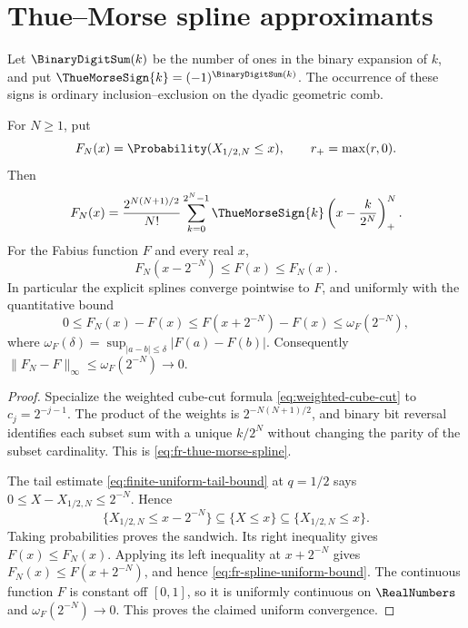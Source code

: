 \section{Thue--Morse spline approximants}
\label{sec:fr-thue-morse}

Let \(\BinaryDigitSum(k)\) be the number of ones in the binary expansion of \(k\), and put
\(\ThueMorseSign{k}=(-1)^{\BinaryDigitSum(k)}\).  The occurrence of these signs is ordinary
inclusion--exclusion on the dyadic geometric comb.

\begin{corollary}
\label{thm:fr-thue-morse-splines}
For \(N\ge1\), put
\[
 F_N(x)=\Probability(X_{1/2,N}\le x),
 \qquad r_+=\max(r,0).
\]
Then
\begin{equation}
 F_N(x)=\frac{2^{N(N+1)/2}}{N!}
 \sum_{k=0}^{2^N-1}\ThueMorseSign{k}
 \left(x-\frac{k}{2^N}\right)_+^N.
 \label{eq:fr-thue-morse-spline}
\end{equation}
For the Fabius function \(F\) and every real \(x\),
\begin{equation}
 F_N(x-2^{-N})\le F(x)\le F_N(x).
 \label{eq:fr-spline-sandwich}
\end{equation}
In particular the explicit splines converge pointwise to \(F\), and uniformly
with the quantitative bound
\begin{equation}
 0\le F_N(x)-F(x)
 \le F(x+2^{-N})-F(x)
 \le \omega_F(2^{-N}),
 \label{eq:fr-spline-uniform-bound}
\end{equation}
where
\(\omega_F(\delta)=\sup_{|a-b|\le\delta}|F(a)-F(b)|\).  Consequently
\(\|F_N-F\|_\infty\le\omega_F(2^{-N})\to0\).
\end{corollary}

\begin{proof}
Specialize the weighted cube-cut formula \cref{eq:weighted-cube-cut} to
\(c_j=2^{-j-1}\).  The product of the weights is
\(2^{-N(N+1)/2}\), and binary bit reversal identifies each subset sum with a
unique \(k/2^N\) without changing the parity of the subset cardinality.  This
is \cref{eq:fr-thue-morse-spline}.

The tail estimate \cref{eq:finite-uniform-tail-bound} at \(q=1/2\) says
\(0\le X-X_{1/2,N}\le2^{-N}\).  Hence
\[
 \{X_{1/2,N}\le x-2^{-N}\}
 \subseteq\{X\le x\}
 \subseteq\{X_{1/2,N}\le x\}.
\]
Taking probabilities proves the sandwich.  Its right inequality gives
\(F(x)\le F_N(x)\).  Applying its left inequality at \(x+2^{-N}\) gives
\(F_N(x)\le F(x+2^{-N})\), and hence
\cref{eq:fr-spline-uniform-bound}.  The continuous function \(F\) is constant
off \([0,1]\), so it is uniformly continuous on \(\RealNumbers\) and
\(\omega_F(2^{-N})\to0\).  This proves the claimed uniform convergence.
\end{proof}

